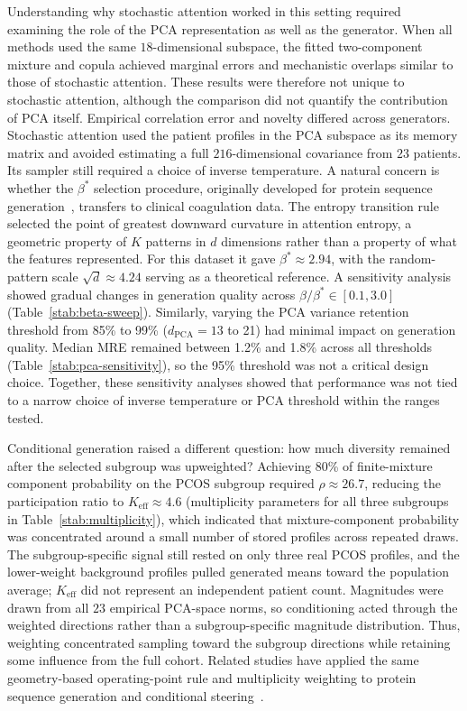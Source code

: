 Understanding why stochastic attention worked in this setting required examining the role of the
PCA representation as well as the generator. When all methods used
the same $18$-dimensional subspace, the fitted two-component mixture and copula achieved
marginal errors and mechanistic overlaps similar to those of stochastic attention. These results were therefore
not unique to stochastic attention, although the comparison did not quantify the contribution
of PCA itself. Empirical correlation error and novelty differed across generators. Stochastic
attention used the patient profiles in the PCA subspace as its memory matrix and avoided
estimating a full $216$-dimensional covariance from $23$ patients. Its sampler still required
a choice of inverse temperature. A natural concern is whether the $\beta^*$
selection procedure, originally developed for protein sequence
generation~\citep{Varner2026SAProtein}, transfers to clinical coagulation data. The entropy
transition rule selected the point of greatest downward curvature in attention entropy, a
geometric property of $K$ patterns in $d$ dimensions rather than a property of what the
features represented. For this dataset it gave $\beta^* \approx 2.94$, with the random-pattern
scale $\sqrt{d} \approx 4.24$ serving as a theoretical reference. A sensitivity analysis
showed gradual changes in generation quality across $\beta/\beta^* \in [0.1, 3.0]$
(Table~\ref{stab:beta-sweep}).
Similarly, varying the PCA variance retention threshold from 85\% to 99\%
($d_{\text{PCA}} = 13$ to 21) had minimal impact on generation quality. Median MRE
remained between 1.2\% and 1.8\% across all thresholds (Table~\ref{stab:pca-sensitivity}),
so the 95\% threshold was not a critical design choice. Together, these sensitivity
analyses showed that performance was not tied to a narrow choice of inverse temperature or
PCA threshold within the ranges tested.

Conditional generation raised a different question: how much diversity remained after the
selected subgroup was upweighted? Achieving
80\% of finite-mixture component probability on the PCOS subgroup required
$\rho \approx 26.7$, reducing the participation ratio to
$K_{\text{eff}} \approx 4.6$ (multiplicity parameters
for all three subgroups in Table~\ref{stab:multiplicity}),
which indicated that mixture-component probability was concentrated around a small number
of stored profiles across repeated draws. The subgroup-specific signal still rested on only
three real PCOS profiles, and the lower-weight background profiles pulled generated means
toward the population average; $K_{\text{eff}}$ did not represent an independent patient
count. Magnitudes were drawn from all $23$ empirical PCA-space norms, so conditioning acted
through the weighted directions rather than a subgroup-specific magnitude distribution.
Thus, weighting concentrated sampling toward the subgroup directions while retaining some
influence from the full cohort.
Related studies have applied the same geometry-based operating-point rule
and multiplicity weighting to protein sequence generation and conditional
steering~\citep{Varner2026SAProtein,Varner2026Multiplicity,Alswaidan2026SA}.

